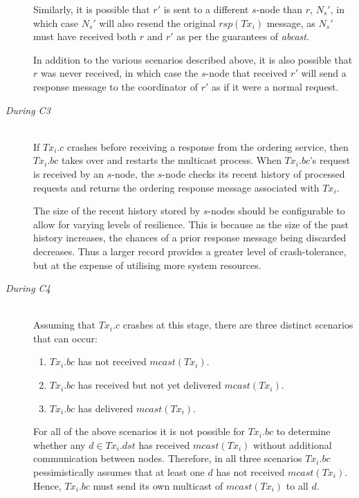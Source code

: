 \begin{description}
        Similarly, it is possible that $r'$ is sent to a different $s$-node than $r$, $N_s'$, in which case $N_s'$ will also resend the original $rsp(Tx_i)$ message, as $N_s'$ must have received both $r$ and $r'$ as per the guarantees of \emph{abcast}.  
        
        In addition to the various scenarios described above, it is also possible that $r$ was never received, in which case the $s$-node that received $r'$ will send a response message to the coordinator of $r'$ as if it were a normal request.  
        
        \item[\emph{During C3}]  \hfill \\
        If $Tx_i.c$ crashes before receiving a response from the ordering service, then $Tx_i.bc$ takes over and restarts the multicast process.  When $Tx_i.bc$'s request is received by an $s$-node, the $s$-node checks its recent history of processed requests and returns the ordering response message associated with $Tx_i$.  
        
        The size of the recent history stored by $s$-nodes should be configurable to allow for varying levels of resilience.   This is because as the size of the past history increases, the chances of a prior response message being discarded decreases.  Thus a larger record provides a greater level of crash-tolerance, but at the expense of utilising more system resources.  
        
        \item[\emph{During C4}]  \hfill \\
                Assuming that $Tx_i.c$ crashes at this stage, there are three distinct scenarios that can occur:
                
                \begin{enumerate}[label=\roman*]
                    \item    $Tx_i.bc$ has not received $mcast(Tx_i)$.                  
                
                    \item    $Tx_i.bc$ has received but not yet delivered $mcast(Tx_i)$.
                    
                    \item    $Tx_i.bc$ has delivered $mcast(Tx_i)$.  
                \end{enumerate}
                
                For all of the above scenarios it is not possible for $Tx_i.bc$ to determine whether any $d \in Tx_i.dst$ has received $mcast(Tx_i)$ without additional communication between nodes.  Therefore, in all three scenarios $Tx_i.bc$ pessimistically assumes that at least one $d$ has not received $mcast(Tx_i)$.  Hence, $Tx_i.bc$ must send its own multicast of $mcast(Tx_i)$ to all $d$.  


\end{description}
